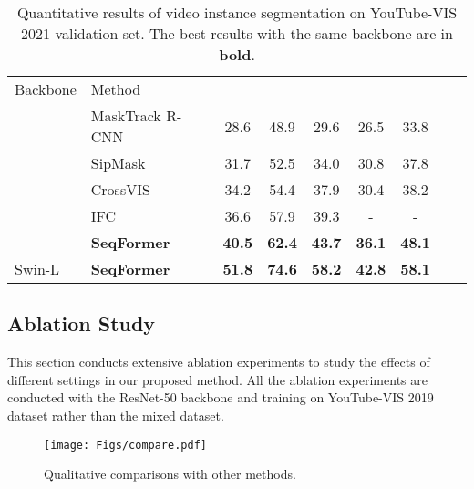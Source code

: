 \documentclass[runningheads]{llncs}
\begin{document}
\setlength{\tabcolsep}{4pt}
\begin{table}[tb]
\begin{center}
\caption{Quantitative results of video instance segmentation on YouTube-VIS 2021 validation set. The best results with the same backbone are in \textbf{bold}.}
\label{table:main_ytvis21}
\begin{tabular}{llccccccc}
\hline\noalign{\smallskip}
Backbone   &Method  &    &  & &  &  \\
\noalign{\smallskip}
\hline
\noalign{\smallskip}
\multirow{5}{*}{ResNet-50}
&MaskTrack R-CNN~\cite{yang2019video}     &28.6 &48.9 &29.6 &26.5 &33.8 \\
&SipMask~\cite{cao2020sipmask}        &31.7 &52.5 &34.0 &30.8 &37.8    \\
&CrossVIS~\cite{yang2021crossover}        &34.2 &54.4 &37.9 &30.4 &38.2  \\
&IFC~\cite{IFC}            &36.6 &57.9 &39.3 &- &-  \\
&\textbf{SeqFormer}        &\textbf{40.5} &\textbf{62.4} &\textbf{43.7} &\textbf{36.1} &\textbf{48.1}  \\  
\hline
Swin-L &\textbf{SeqFormer}       &\textbf{51.8} &\textbf{74.6} &\textbf{58.2} &\textbf{42.8} &\textbf{58.1} \\
\hline
\end{tabular}
\end{center}
\end{table}









\subsection{ Ablation Study }
This section conducts extensive ablation experiments to study the effects of different settings in our proposed method. All the ablation experiments are conducted with the ResNet-50 backbone and training on YouTube-VIS 2019 dataset rather than the mixed dataset.


\begin{figure*}[tb]
\centering
\texttt{[image: Figs/compare.pdf]}
\caption{Qualitative comparisons with other methods.}
\label{fig:visualization_compare}
\end{figure*}
\end{document}

